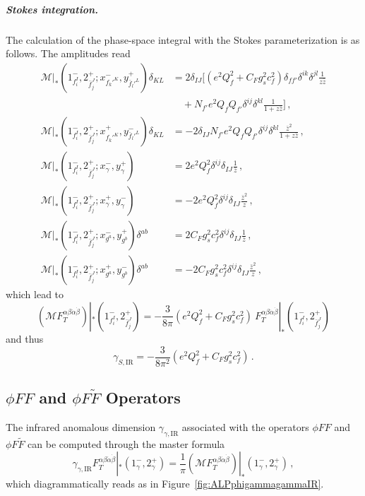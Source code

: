 \begin{subappendices}
\subparagraph{Stokes integration.}
The calculation of the phase-space integral with the Stokes parameterization is as follows.
The amplitudes read
\begin{align}
    \mathcal M|_{*} (1_{f_i^I}^{-},2_{\bar f_j^J}^{+}; x_{f_k'^K}^{-},y_{\bar f_l'^L}^{+})\delta_{KL} &=
2\delta_{IJ}\bigg[(e^2Q_f^2+C_Fg_s^2c_f^2)\delta_{ff'}\delta^{ik}\delta^{jl}\frac{1}{z \bar z}\nonumber\\ &\quad + N_{f'} e^2Q_f Q_{f'} \delta^{ij}\delta^{kl}\frac{1}{1+z\bar z} \bigg]\,, \\
    \mathcal M|_{*} (1_{f_i^I}^{-},2_{\bar f_j^J}^{+}; x_{f_k'^K}^{+},y_{\bar f_l'^L}^{-})\delta_{KL} &= -2\delta_{IJ} N_{f'} e^2Q_f Q_{f'}\delta^{ij}\delta^{kl}\frac{\bar z^2}{1+z\bar z}\,, \\
    \mathcal M|_*(1^-_{f_i^I},2^+_{\bar f_j^J};x^-_\gamma,y^+_\gamma) &= 2e^2Q_f^2\delta^{ij}\delta_{IJ}\frac{1}{\bar z}\,, \\
    \mathcal M|_*(1^-_{f_i^I},2^+_{\bar f_j^J};x^+_\gamma,y^-_\gamma) &= -2e^2Q_f^2\delta^{ij}\delta_{IJ}\frac{\bar z^2}{z}\,, \\
    \mathcal M|_*(1^-_{f_i^I},2^+_{\bar f_j^J};x^-_{g^a},y^+_{g^b})\delta^{ab} &= 2C_Fg_s^2c_f^2\delta^{ij}\delta_{IJ}\frac{1}{\bar z}\,, \\
    \mathcal M|_*(1^-_{f_i^I},2^+_{\bar f_j^J};x^+_{g^a},y^-_{g^b})\delta^{ab} &= -2C_Fg_s^2c_f^2\delta^{ij}\delta_{IJ}\frac{\bar z^2}{z}\,,
\end{align}
which lead to
\begin{equation}
    (\mathcal M F_T^{\alpha\beta\dot\alpha\dot\beta})|_{*}(1^-_{f_i^I},2^+_{\bar f_j^J}) =  -\frac{3}{8\pi}(e^2Q_f^2+C_Fg_s^2c_f^2) \ F_T^{\alpha\beta\dot\alpha\dot\beta}|_{*}(1^-_{f_i^I},2^+_{\bar f_j^J})
\end{equation}
and thus
\begin{equation}\label{eq:ALPgammaS_IR_stokes}
    \gamma_{S,\text{IR}} = -\frac{3}{8\pi^2}(e^2Q_f^2+C_Fg_s^2c_f^2)\,.
\end{equation}

\subsection{\texorpdfstring{$\phi FF$ and $\phi F\widetilde F$ Operators}{phi F F and phi F Ftilde Operators}}
\label{sec:ALPIRphigammagamma}

The infrared anomalous dimension $\gamma_{\gamma,\text{IR}}$ associated with the operators
$\phi FF$ and $\phi F\widetilde F$ can be computed through the master formula
\begin{equation}
    \gamma_{\gamma,\text{IR}} F_T^{\alpha\beta\dot\alpha\dot\beta}|_{*}(1^-_\gamma,2^+_\gamma)=\frac{1}{\pi}(\mathcal M F_T^{\alpha\beta\dot\alpha\dot\beta})|_{*}(1^-_\gamma,2^+_\gamma)\,,
\end{equation}
which diagrammatically reads as in Figure~\ref{fig:ALPphigammagammaIR}.


\end{subappendices}
